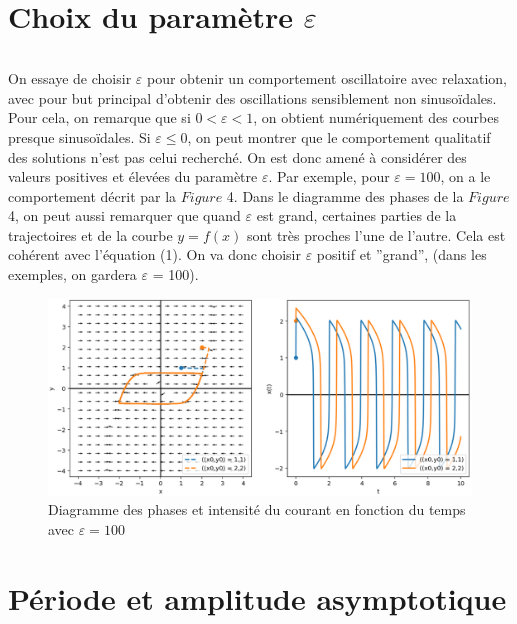 \documentclass{article}
\begin{document}
\newpage
\section{Choix du paramètre $\varepsilon$}

\[\]

On essaye de choisir $\varepsilon$ pour obtenir un comportement oscillatoire avec relaxation, avec pour
but principal d’obtenir des oscillations sensiblement non sinusoïdales. Pour cela, on remarque
que si $0 <\varepsilon < 1$, on obtient numériquement des courbes presque sinusoïdales. Si
$\varepsilon \leq 0$, on peut
montrer que le comportement qualitatif des solutions n’est pas celui recherché.
On est donc amené à considérer des valeurs positives et élevées du paramètre $\varepsilon$. 
Par exemple, pour $\varepsilon = 100$, on a le comportement décrit par la $Figure$ 4.
Dans le diagramme des phases de la $Figure$ 4, on peut aussi remarquer que quand $\varepsilon$ est grand,
certaines parties de la trajectoires et de la courbe $y = f (x)$ sont très proches l’une de l’autre.
Cela est cohérent avec l’équation (1). On va donc choisir $\varepsilon$ positif et ”grand”, (dans les exemples, on gardera
$\varepsilon$ = 100).

\begin{figure}[!h]
    \centering
    \includegraphics[scale=0.4]{../images/epsilon_choice.png}
    \captionsetup{justification=centering,margin=2cm}
    \caption{Diagramme des phases et intensité du courant en fonction du temps avec $\varepsilon = 100$}
    \end{figure}

\section{Période et amplitude asymptotique}
\end{document}
